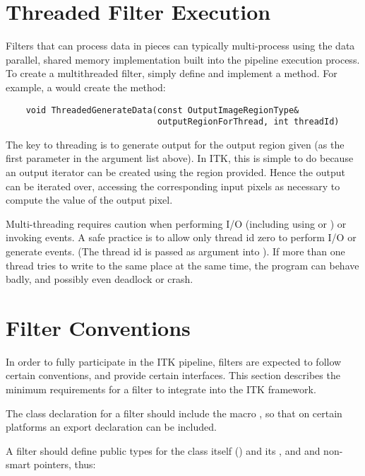 \section{Threaded Filter Execution}
\label{sec:ThreadedFilterExecution}

Filters that can process data in pieces can typically multi-process
using the data parallel, shared memory implementation built into the
pipeline execution process. To create a multithreaded filter, simply
define and implement a  method. For
example, a  would create the method:

\small
\begin{verbatim}
    void ThreadedGenerateData(const OutputImageRegionType& 
                              outputRegionForThread, int threadId)
\end{verbatim}
\normalsize

The key to threading is to generate output for the output region given (as
the first parameter in the argument list above). In ITK, this is simple to do
because an output iterator can be created using the region provided. Hence
the output can be iterated over, accessing the corresponding input pixels as
necessary to compute the value of the output pixel.

Multi-threading requires caution when performing I/O (including using
 or ) or invoking events. A safe practice is to allow 
only thread id zero to perform I/O or generate events. (The thread id is
passed as argument into ).  If more than one
thread tries to write to the same place at the same time, the program can
behave badly, and possibly even deadlock or crash.


\section{Filter Conventions}

In order to fully participate in the ITK pipeline, filters are expected to
follow certain conventions, and provide certain interfaces.  This section
describes the minimum requirements for a filter to integrate into the ITK
framework.

The class declaration for a filter should include the macro
, so that on certain platforms an export declaration can be
included. 

A filter should define public types for the class itself () and
its , and  and non- smart pointers,
thus:

